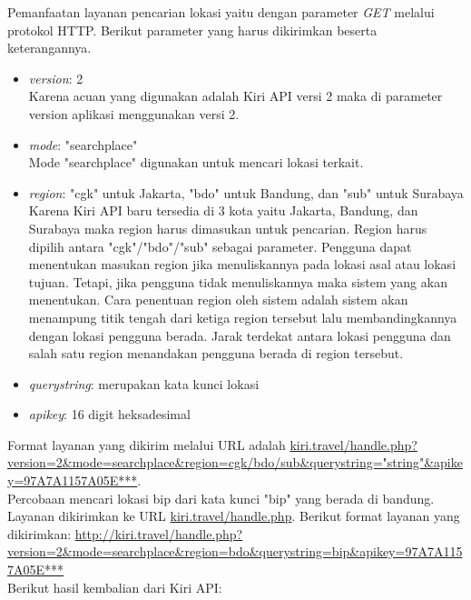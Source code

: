 Pemanfaatan layanan pencarian lokasi yaitu dengan parameter \textit{GET} melalui protokol HTTP. Berikut parameter yang harus dikirimkan beserta keterangannya.
\begin{itemize}
	\item \textit{version}: 2 \\
	Karena acuan yang digunakan adalah Kiri API versi 2 maka di parameter version aplikasi menggunakan versi 2.
	\item \textit{mode}: "searchplace" \\
	Mode "searchplace" digunakan untuk mencari lokasi terkait.
	\item \textit{region}: "cgk" untuk Jakarta, "bdo" untuk Bandung, dan "sub" untuk Surabaya \\
	Karena Kiri API baru tersedia di 3 kota yaitu Jakarta, Bandung, dan Surabaya maka region harus dimasukan untuk pencarian. Region harus dipilih antara "cgk"/"bdo"/"sub" sebagai parameter. Pengguna dapat menentukan masukan region jika menuliskannya pada lokasi asal atau lokasi tujuan. Tetapi, jika pengguna tidak menuliskannya maka sistem yang akan menentukan. Cara penentuan region oleh sistem adalah sistem akan menampung titik tengah dari ketiga region tersebut lalu membandingkannya dengan lokasi pengguna berada. Jarak terdekat antara lokasi pengguna dan salah satu region menandakan pengguna berada di region tersebut.
	\item \textit{querystring}: merupakan kata kunci lokasi 
	\item \textit{apikey}: 16 digit heksadesimal
\end{itemize}
Format layanan yang dikirim melalui URL adalah \url{kiri.travel/handle.php?version=2&mode=searchplace&region=cgk/bdo/sub&querystring="string"&apikey=97A7A1157A05E***}.
\newline
\\Percobaan mencari lokasi bip dari kata kunci "bip" yang berada di bandung. Layanan dikirimkan ke URL \url{kiri.travel/handle.php}. 
Berikut format layanan yang dikirimkan:\newline
{\url{http://kiri.travel/handle.php?version=2&mode=searchplace&region=bdo&querystring=bip&apikey=97A7A1157A05E***}}
\newline
\\Berikut hasil kembalian dari Kiri API: 

